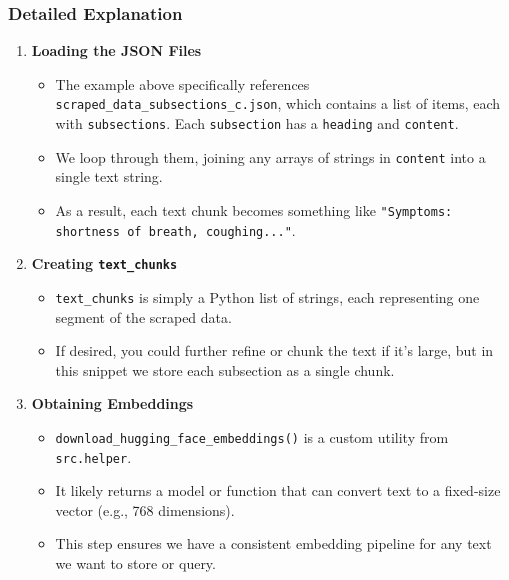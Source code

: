 \subsubsection*{Detailed Explanation}

\begin{enumerate}
    \item \textbf{Loading the JSON Files}
    \begin{itemize}
        \item The example above specifically references \texttt{scraped\_data\_subsections\_c.json}, which contains
        a list of items, each with \texttt{subsections}. Each \texttt{subsection} has a \texttt{heading} and
        \texttt{content}. 
        \item We loop through them, joining any arrays of strings in \texttt{content} into a single text string. 
        \item As a result, each text chunk becomes something like \texttt{"Symptoms: shortness of breath, coughing..."}.
    \end{itemize}

    \item \textbf{Creating \texttt{text\_chunks}}
    \begin{itemize}
        \item \texttt{text\_chunks} is simply a Python list of strings, each representing one segment
        of the scraped data. 
        \item If desired, you could further refine or chunk the text if it’s large, but in this snippet
        we store each subsection as a single chunk.
    \end{itemize}

    \item \textbf{Obtaining Embeddings}
    \begin{itemize}
        \item \texttt{download\_hugging\_face\_embeddings()} is a custom utility from \texttt{src.helper}.  
        \item It likely returns a model or function that can convert text to a fixed-size vector (e.g., 768 dimensions).
        \item This step ensures we have a consistent embedding pipeline for any text we want to store or query.
    \end{itemize}


\end{enumerate}
